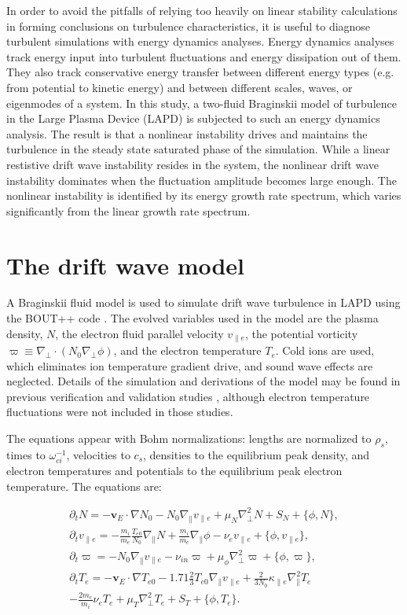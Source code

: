 \documentclass[showpacs,preprintnumbers,amsmath,amssymb,superscriptaddress]{revtex4}
\def\beqar{\begin{eqnarray}}
\def\eeqar{\end{eqnarray}}
\newcommand{\pdt}{\partial_t}
\def\grad{\nabla}
\newcommand{\gradpar}{\grad_\parallel}
\newcommand{\gradperp}{\grad_\perp}
\newcommand{\vpe}{v_{\parallel e}}
\newcommand{\nue}{\nu_{e}}
\newcommand{\nuin}{\nu_{in}}
\newcommand{\kpe}{\kappa_{\parallel e}}
\newcommand{\fmie}{\frac{m_i}{m_e}}
\begin{document}
In order to avoid the pitfalls of relying too heavily on linear stability calculations in forming conclusions on turbulence characteristics, it is useful to diagnose turbulent simulations
with energy dynamics analyses. Energy dynamics analyses track energy input into turbulent fluctuations and energy dissipation out of them. They also track conservative energy transfer
between different energy types (e.g. from potential to kinetic energy) and between different scales, waves, or eigenmodes of a system. In this study, a 
two-fluid Braginskii model of turbulence in the Large Plasma Device (LAPD) is subjected to such an energy dynamics analysis. The result is that a nonlinear instability drives and maintains
the turbulence in the steady state saturated phase of the simulation. While a linear restistive drift wave instability resides in the system, the nonlinear drift wave instability dominates
when the fluctuation amplitude becomes large enough. The nonlinear instability is identified by its energy growth rate spectrum, which varies significantly from the linear growth rate spectrum.


\section{The drift wave model}
\label{dw_model}

A Braginskii fluid model \cite{Braginskii1965} is used to simulate drift wave turbulence in LAPD using the BOUT++ code \cite{dudson2009}. 
The evolved variables used in the model are the plasma density, $N$, the electron fluid parallel velocity $\vpe$, the potential vorticity $\varpi \equiv \gradperp \cdot (N_0 \gradperp \phi)$,
and the electron temperature $T_e$. Cold ions are used, which eliminates ion temperature gradient drive, and sound wave effects are neglected. Details of the simulation and derivations of the model
may be found in previous verification and validation studies \cite{Popovich2010a,Popovich2010b,Umansky2011,friedman2012}, although electron temperature fluctuations were not included in those studies.

The equations appear with Bohm normalizations: lengths are normalized to $\rho_s$, times to $\omega_{ci}^{-1}$, velocities to $c_s$, densities to the equilibrium peak density, and electron
temperatures and potentials to the equilibrium peak electron temperature. The equations are:

\beqar
\label{ni_eq}
\pdt N = - {\mathbf v_E} \cdot \grad N_0 - N_0 \gradpar \vpe + \mu_N \gradperp^2 N + S_N + \{\phi,N\}, \\
\label{ve_eq}
\pdt \vpe = - \fmie \frac{T_{e0}}{N_0} \gradpar N + \fmie \gradpar \phi - \nue \vpe + \{\phi,\vpe \}, \\
\label{rho_eq}
\pdt \varpi = - N_0 \gradpar \vpe  - \nuin \varpi + \mu_\phi \gradperp^2 \varpi + \{\phi,\varpi \}, \\
\label{te_eq}
\pdt T_e = - {\mathbf v_E} \cdot \grad T_{e0} - 1.71 \frac{2}{3} T_{e0} \gradpar \vpe + \frac{2}{3 N_0} \kpe \gradpar^2 T_e  \nonumber \\
- \frac{2 m_e}{m_i} \nue T_e  + \mu_T \gradperp^2 T_e +  S_T + \{\phi,T_e\}.
\eeqar
\end{document}
